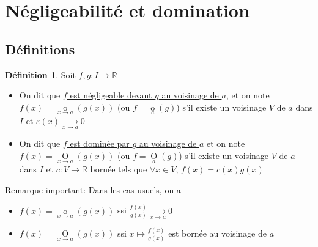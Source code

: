 \documentclass[10pt,a4paper]{article}
\theoremstyle{definition}
\newtheorem{definition}[proposition]{Définition}
\DeclareMathOperator*{\negl}{o}
\DeclareMathOperator*{\dom}{O}
\begin{document}
\section{Négligeabilité et domination}
\subsection{Définitions}
\begin{definition}
Soit $f,g: I \to \mathbb{R}$
\begin{itemize}
\item On dit que \uline{$f$ est négligeable devant $g$ au voisinage de $a$}, et on note $f(x) = \negl\limits_{x \to a} (g(x))$ (ou $f = \negl\limits_{a}(g)$) s'il existe un voisinage $V$ de $a$ dans $I$ et $\varepsilon(x) \xrightarrow[x \to a]{} 0$
\item On dit que \uline{$f$ est dominée par $g$ au voisinage de $a$} et on note $f(x) = \dom\limits_{x \to a}(g(x))$ (ou $f = \dom\limits_{a}(g)$) s'il existe un voisinage $V$ de $a$ dans $I$ et $c: V \to \mathbb{R}$ bornée tels que $\forall x \in V$, $f(x) = c(x) g(x)$
\end{itemize}
\end{definition}
\medskip
\noindent \uline{Remarque important}: Dans les cas usuels, on a
\begin{itemize}
\item $f(x) = \negl\limits_{x \to a}(g(x))$ ssi $\frac{f(x)}{g(x)} \xrightarrow[x \to a]{} 0$
\item $f(x) = \dom\limits_{x \to a}(g(x))$ ssi $x \mapsto \frac{f(x)}{g(x)}$ est bornée au voisinage de $a$
\end{itemize}
\end{document}
